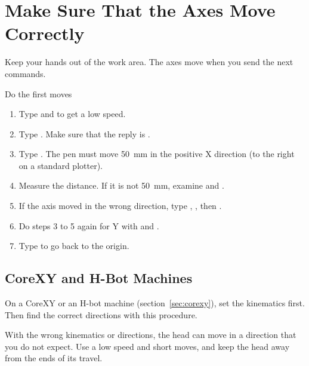 \section{Make Sure That the Axes Move Correctly}

\begin{warning}
Keep your hands out of the work area. The axes move when you send the next
commands.
\end{warning}

\begin{procedure}{Do the first moves}
\begin{enumerate}
  \item Type  and  to get a low speed.
  \item Type . Make sure that the reply is .
  \item Type . The pen must move \SI{50}{mm} in the positive
        X direction (to the right on a standard plotter).
  \item Measure the distance. If it is not \SI{50}{mm}, examine
         and .
  \item If the axis moved in the wrong direction, type ,
        , then .
  \item Do steps 3 to 5 again for Y with  and .
  \item Type  to go back to the origin.
\end{enumerate}
\end{procedure}

\subsection{CoreXY and H-Bot Machines}\label{sec:corexy-check}

On a CoreXY or an H-bot machine (section~\ref{sec:corexy}), set the
kinematics first. Then find the correct directions with this procedure.

\begin{warning}
With the wrong kinematics or directions, the head can move in a direction
that you do not expect. Use a low speed and short moves, and keep the head
away from the ends of its travel.
\end{warning}

